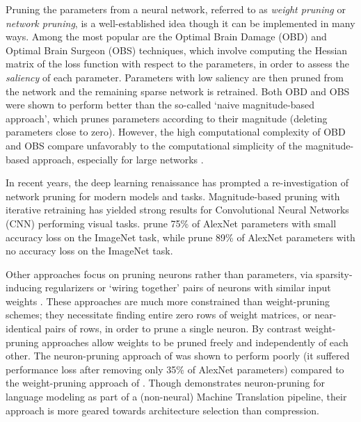 Pruning the parameters from a neural network, referred to as \textit{weight pruning} or \textit{network pruning}, is a well-established idea though it can be implemented in many ways. 
Among the most popular are the Optimal Brain Damage (OBD)
\cite{lecun1989optimal} and Optimal Brain Surgeon (OBS) \cite{hassibi1993second} techniques, which involve computing the Hessian matrix of the loss function with respect to the parameters, in order to assess the \textit{saliency} of each parameter. 
Parameters with low saliency are then pruned from the network and the remaining sparse network is retrained. 
Both OBD and OBS were shown to perform better than the so-called `naive magnitude-based approach', which prunes parameters according to their magnitude (deleting parameters close to zero).
However, the high computational complexity of OBD and OBS compare unfavorably to the computational simplicity of the magnitude-based approach, especially for large networks \cite{augasta2013pruning}.

In recent years, the deep learning renaissance has prompted a re-investigation of network pruning for modern models and tasks. 
Magnitude-based pruning with iterative retraining has yielded strong results for Convolutional Neural Networks (CNN) performing visual tasks.
\cite{collins2014memory} prune 75\% of AlexNet parameters with small accuracy loss on the ImageNet task, while \cite{han2015learning} prune 89\% of AlexNet parameters with no accuracy loss on the ImageNet task.

Other approaches focus on pruning neurons rather than parameters, via sparsity-inducing regularizers \cite{murray2015auto} or `wiring together' pairs of neurons with similar input weights \cite{srinivas2015data}. These approaches are much more constrained than weight-pruning schemes; they necessitate finding entire zero rows of weight matrices, or near-identical pairs of rows, in order to prune a single neuron. By contrast weight-pruning approaches allow weights to be pruned freely and independently of each other. The neuron-pruning approach of \cite{srinivas2015data} was shown to perform poorly (it suffered performance loss after removing only 35\% of AlexNet parameters) compared to the weight-pruning approach of \cite{han2015learning}. 
Though \cite{murray2015auto} demonstrates neuron-pruning for language modeling as part of a (non-neural) Machine Translation pipeline, their approach is more geared towards architecture selection than compression.


